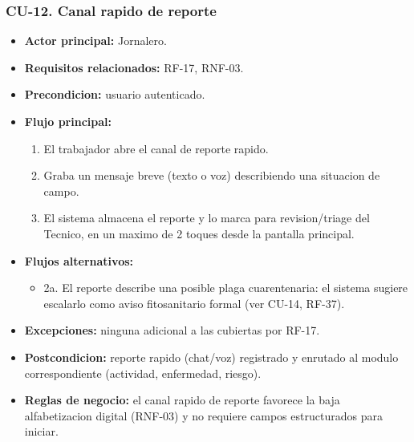 \documentclass[11pt,a4paper]{article}
\begin{document}
\subsubsection{CU-12. Canal rapido de reporte}
\begin{itemize}
\item \textbf{Actor principal:} Jornalero.
\item \textbf{Requisitos relacionados:} RF-17, RNF-03.
\item \textbf{Precondicion:} usuario autenticado.
\item \textbf{Flujo principal:}
  \begin{enumerate}
  \item El trabajador abre el canal de reporte rapido.
  \item Graba un mensaje breve (texto o voz) describiendo una situacion de campo.
  \item El sistema almacena el reporte y lo marca para revision/triage del Tecnico, en un maximo de 2 toques desde la pantalla principal.
  \end{enumerate}
\item \textbf{Flujos alternativos:}
  \begin{itemize}
  \item 2a. El reporte describe una posible plaga cuarentenaria: el sistema sugiere escalarlo como aviso fitosanitario formal (ver CU-14, RF-37).
  \end{itemize}
\item \textbf{Excepciones:} ninguna adicional a las cubiertas por RF-17.
\item \textbf{Postcondicion:} reporte rapido (chat/voz) registrado y enrutado al modulo correspondiente (actividad, enfermedad, riesgo).
\item \textbf{Reglas de negocio:} el canal rapido de reporte favorece la baja alfabetizacion digital (RNF-03) y no requiere campos estructurados para iniciar.
\end{itemize}
\end{document}
